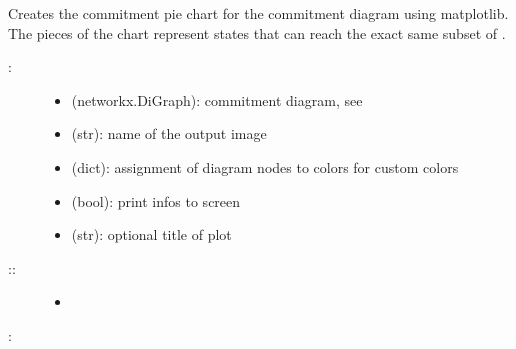 \documentclass[letterpaper,10pt,english]{sphinxmanual}
\begin{document}
\begin{fulllineitems}
\label{\detokenize{Commitment:PyBoolNet.Commitment.create_piechart}}
Creates the commitment pie chart for the commitment diagram using matplotlib.
The pieces of the chart represent states that can reach the exact same subset of .
\begin{description}
\item[{:}] \leavevmode\begin{itemize}
\item {} 
 (networkx.DiGraph): commitment diagram, see {\hyperref[\detokenize{Commitment:commitment-compute-diagram}]{}}

\item {} 
 (str): name of the output image

\item {} 
 (dict): assignment of diagram nodes to colors for custom colors

\item {} 
 (bool): print infos to screen

\item {} 
 (str): optional title of plot

\end{itemize}

\item[{::}] \leavevmode\begin{itemize}
\item {} 

\end{itemize}

\end{description}

:

\begin{sphinxVerbatim}[commandchars=\\\{\}]
  
   
  
 
\end{sphinxVerbatim}

\end{fulllineitems}
\end{document}
